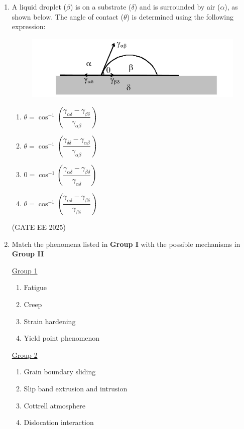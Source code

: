 \documentclass[11pt, letterpaper]{article}
\theoremstyle{remark}
\begin{document}
\begin{enumerate}
\item A liquid droplet ($\beta$) is on a substrate ($\delta$) and is surrounded by air ($\alpha$), as shown below. The angle of contact ($\theta$) is determined using the following expression:

\begin{figure}
    \centering
    \includegraphics[width=0.5\linewidth]{figs/image2.png}
    \label{fig:placeholder}
\end{figure}

\begin{multicols}{2}
\begin{enumerate}  
\item $\theta = \cos^{-1} \left( \dfrac{\gamma_{\alpha \delta} - \gamma_{\beta \delta}}{\gamma_{\alpha \beta}} \right)$
\item $\theta = \cos^{-1} \left( \dfrac{\gamma_{\delta \delta} - \gamma_{\alpha \beta}}{\gamma_{\alpha \beta}} \right)$
\item $0 = \cos^{-1} \left( \dfrac{\gamma_{\alpha \delta} - \gamma_{\beta \delta}}{\gamma_{\alpha \delta}} \right)$
\item $\theta = \cos^{-1} \left( \dfrac{\gamma_{\alpha \delta} - \gamma_{\beta \delta}}{\gamma_{\beta \delta}} \right)$
\end{enumerate}
\end{multicols}
\hfill(GATE EE 2025)

\item Match the phenomena listed in \textbf{Group I} with the possible mechanisms in \textbf{Group II}
\begin{multicols}{2}
\underline{Group 1}
\begin{enumerate}[label=(\Alph*), start=16]
\item Fatigue   
\item Creep
\item Strain hardening  
\item Yield point phenomenon
\end{enumerate}

\underline{Group 2}
\begin{enumerate}[label=(\arabic*), start=1]
\item Grain boundary sliding 
\item Slip band extrusion and intrusion
\item Cottrell atmosphere
\item Dislocation interaction
\end{enumerate}
\end{multicols}


\end{enumerate}
\end{document}

